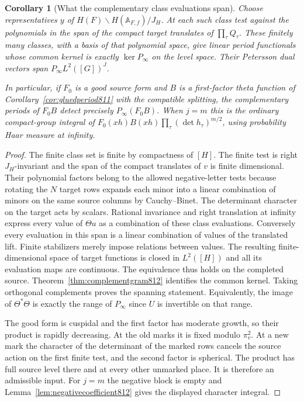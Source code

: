 \documentclass[a4paper,11pt]{article}
\newtheorem{corollary}[proposition]{Corollary}
\theoremstyle{definition}
\theoremstyle{remark}
\numberwithin{equation}{section}
\begin{document}
\begin{corollary}[What the complementary class evaluations span]
\leavevmode\label{cor:complementreproduce812}
Choose representatives \(y\) of
\(H(F)\backslash H(\mathbb A_{F,f})/J_H\). At each such class
test against the polynomials in the span of the compact
target translates of \(\prod_\tau Q_\tau\). These finitely
many classes, with a basis of that polynomial space, give
linear period functionals whose common kernel is exactly
\(\ker P_\infty\) on the level space. Their Petersson dual
vectors span \(P_\infty L^2([G])^J\).

In particular, if \(F_0\) is a good source form and \(B\) is
a first-factor theta function of Corollary~\ref{cor:gluedperiod811}
with the compatible splitting, the complementary periods of
\(F_0B\) detect precisely \(P_\infty(F_0B)\). When \(j=m\)
this is the ordinary compact-group integral of
\(F_0(xh)B(xh)\prod_\tau(\det h_\tau)^{m/2}\), using
probability Haar measure at infinity.
\end{corollary}
\begin{proof}
The finite class set is finite by compactness of \([H]\).
The finite test is right \(J_H\)-invariant and the span of
the compact translates of \(v\) is finite dimensional.
Their polynomial factors belong to the allowed negative-letter
tests because rotating the \(N\) target rows expands each minor into a
linear combination of minors on the same source columns
by Cauchy--Binet. The determinant character on the target
acts by scalars. Rational invariance and right translation
at infinity express every value of \(\Theta u\) as a
combination of these class evaluations. Conversely every
evaluation in this span is a linear combination of values
of the translated lift. Finite stabilizers merely impose
relations between values. The resulting finite-dimensional
space of target functions is closed in \(L^2([H])\) and all
its evaluation maps are continuous. The equivalence thus
holds on the completed source. Theorem~\ref{thm:complementgram812}
identifies the common kernel. Taking orthogonal complements
proves the spanning statement. Equivalently, the image of
\(\Theta^*\Theta\) is exactly the range of \(P_\infty\)
since \(U\) is invertible on that range.

The good form is cuspidal and the first factor has moderate
growth, so their product is rapidly decreasing. At the old
marks it is fixed modulo \(\pi_v^2\). At a new mark the
character of the determinant of the marked rows cancels
the source action on the first finite test, and the second
factor is spherical. The product has full source level there
and at every other unmarked place. It is therefore an
admissible input. For \(j=m\) the negative block is empty
and Lemma~\ref{lem:negativecoefficient812} gives the displayed
character integral.
\end{proof}
\end{document}
